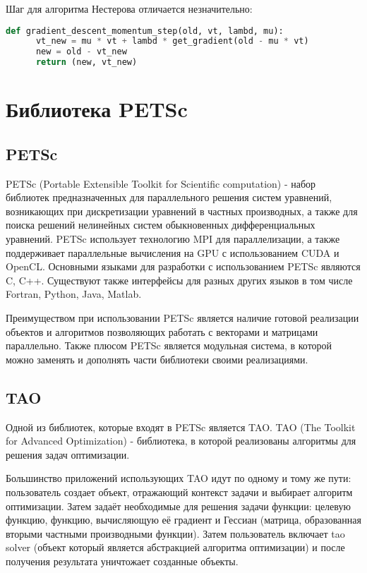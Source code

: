 \documentclass[12pt]{report}
\begin{document}
	Шаг для алгоритма Нестерова отличается незначительно:

  \begin{lstlisting}[language=Python, frame=single]
    def gradient_descent_momentum_step(old, vt, lambd, mu):
      vt_new = mu * vt + lambd * get_gradient(old - mu * vt)
      new = old - vt_new
      return (new, vt_new)
  \end{lstlisting}

  \chapter{Библиотека PETSc}
  \section{PETSc}
  PETSc (Portable Extensible Toolkit for Scientific computation) - набор
  библиотек предназначенных для параллельного решения систем уравнений,
  возникающих при дискретизации уравнений в частных производных, а также для
  поиска решений нелинейных систем обыкновенных дифференциальных уравнений.
  PETSc использует технологию MPI для параллелизации, а также поддерживает
  параллельные вычисления на GPU с использованием CUDA и OpenCL. Основными
  языками для разработки с использованием PETSc являются C, C++.
  Существуют также интерфейсы для разных других языков в том числе Fortran,
  Python, Java, Matlab.

  Преимуществом при использовании PETSc является наличие готовой реализации
  объектов и алгоритмов позволяющих работать с векторами и матрицами параллельно.
  Также плюсом PETSc является модульная система, в которой можно заменять и
  дополнять части библиотеки своими реализациями.

  \section{TAO}
  Одной из библиотек, которые входят в PETSc является TAO. TAO (The Toolkit for
  Advanced Optimization) - библиотека, в которой реализованы алгоритмы для
  решения задач оптимизации.

  Большинство приложений использующих TAO идут по одному и тому же пути: пользователь
  создает объект, отражающий контекст задачи и выбирает алгоритм оптимизации.
  Затем задаёт необходимые для решения задачи функции: целевую функцию, функцию,
  вычисляющую её градиент и Гессиан (матрица, образованная вторыми частными
  производными функции). Затем пользователь включает tao solver (объект который
  является абстракцией алгоритма оптимизации) и после получения результата уничтожает
  созданные объекты.
\end{document}
